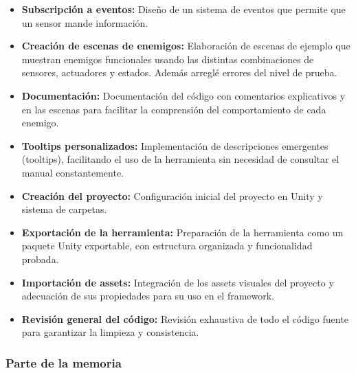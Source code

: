 \begin{itemize}
  \item \textbf{Subscripción a eventos:} Diseño de un sistema de eventos que permite que un sensor mande información.
  \item \textbf{Creación de escenas de enemigos:} Elaboración de escenas de ejemplo que muestran enemigos funcionales usando las distintas combinaciones de sensores, actuadores y estados. Además arreglé errores del nivel de prueba.
  \item \textbf{Documentación:} Documentación del código con comentarios explicativos y en las escenas para facilitar la comprensión del comportamiento de cada enemigo.
  \item \textbf{Tooltips personalizados:} Implementación de descripciones emergentes (tooltips), facilitando el uso de la herramienta sin necesidad de consultar el manual constantemente.
 \item \textbf{Creación del proyecto:} Configuración inicial del proyecto en Unity y sistema de carpetas.
 \item \textbf{Exportación de la herramienta:} Preparación de la herramienta como un paquete Unity exportable, con estructura organizada y funcionalidad probada. 
  \item \textbf{Importación de assets:} Integración de los assets visuales del proyecto y adecuación de sus propiedades para su uso en el framework.
  \item \textbf{Revisión general del código:} Revisión exhaustiva de todo el código fuente para garantizar la limpieza y consistencia.
\end{itemize}

\subsubsection{Parte de la memoria}

